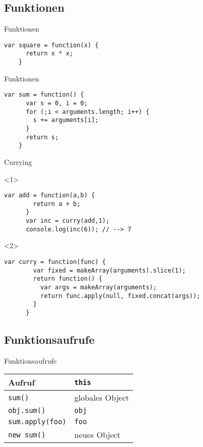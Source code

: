 \subsection{Funktionen}

\begin{frame}[fragile]{Funktionen}
  \begin{lstlisting}[gobble=4]
    var square = function(x) {
      return x * x;
    }
  \end{lstlisting}
\end{frame}

\begin{frame}[fragile]{Funktionen}
  \begin{lstlisting}[gobble=4]
    var sum = function() {
      var s = 0, i = 0;
      for (;i < arguments.length; i++) {
        s += arguments[i];
      }
      return s;
    }
  \end{lstlisting}
\end{frame}

\begin{frame}[fragile]{Currying}
  \begin{onlyenv}<1>
    \begin{lstlisting}[gobble=6]
      var add = function(a,b) {
        return a + b;
      }
      var inc = curry(add,1);
      console.log(inc(6)); // --> 7
    \end{lstlisting}
  \end{onlyenv}
  
  \begin{onlyenv}<2>
    \begin{lstlisting}[gobble=6]
      var curry = function(func) {
        var fixed = makeArray(arguments).slice(1);
        return function() {
          var args = makeArray(arguments);
          return func.apply(null, fixed.concat(args));
        }
      }
    \end{lstlisting}
  \end{onlyenv}
\end{frame}

\subsection{Funktionsaufrufe}

\begin{frame}{Funktionsaufrufe}
  \begin{tabular}{ll}
    Aufruf & \lstinline-this- \\ \hline
    \lstinline-sum()- & globales Object \\
    \lstinline-obj.sum()- & \lstinline-obj- \\
    \lstinline-sum.apply(foo)- & \lstinline-foo- \\
    \lstinline-new sum()- & neues Object
  \end{tabular}
\end{frame}

